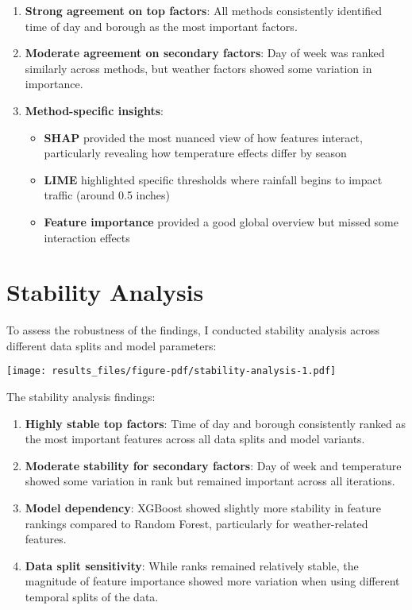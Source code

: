 \documentclass[
  letterpaper,
  DIV=11,
  numbers=noendperiod]{scrreprt}
\providecommand{\tightlist}{%
  \setlength{\itemsep}{0pt}\setlength{\parskip}{0pt}}\usepackage{longtable,booktabs,array}
\begin{document}
\begin{enumerate}
\def\labelenumi{\arabic{enumi}.}
\item
  \textbf{Strong agreement on top factors}: All methods consistently
  identified time of day and borough as the most important factors.
\item
  \textbf{Moderate agreement on secondary factors}: Day of week was
  ranked similarly across methods, but weather factors showed some
  variation in importance.
\item
  \textbf{Method-specific insights}:

  \begin{itemize}
  \tightlist
  \item
    \textbf{SHAP} provided the most nuanced view of how features
    interact, particularly revealing how temperature effects differ by
    season
  \item
    \textbf{LIME} highlighted specific thresholds where rainfall begins
    to impact traffic (around 0.5 inches)
  \item
    \textbf{Feature importance} provided a good global overview but
    missed some interaction effects
  \end{itemize}
\end{enumerate}

\section{Stability Analysis}\label{stability-analysis-1}

To assess the robustness of the findings, I conducted stability analysis
across different data splits and model parameters:

\texttt{[image: results\_files/figure-pdf/stability-analysis-1.pdf]}

The stability analysis findings:

\begin{enumerate}
\def\labelenumi{\arabic{enumi}.}
\item
  \textbf{Highly stable top factors}: Time of day and borough
  consistently ranked as the most important features across all data
  splits and model variants.
\item
  \textbf{Moderate stability for secondary factors}: Day of week and
  temperature showed some variation in rank but remained important
  across all iterations.
\item
  \textbf{Model dependency}: XGBoost showed slightly more stability in
  feature rankings compared to Random Forest, particularly for
  weather-related features.
\item
  \textbf{Data split sensitivity}: While ranks remained relatively
  stable, the magnitude of feature importance showed more variation when
  using different temporal splits of the data.
\end{enumerate}
\end{document}
